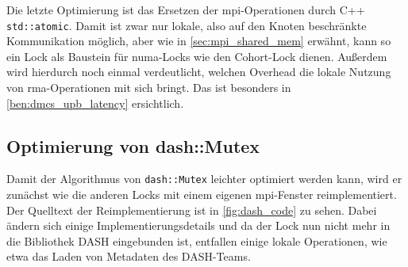 Die letzte Optimierung ist das Ersetzen der \gls{mpi}-Operationen durch C++ \texttt{std::atomic}.
Damit ist zwar nur lokale,
also auf den Knoten beschränkte Kommunikation möglich,
aber wie in \autoref{sec:mpi_shared_mem} erwähnt,
kann so ein Lock als Baustein für \gls{numa}-Locks wie den Cohort-Lock \cite{Cohort-Lock} dienen.
Außerdem wird hierdurch noch einmal verdeutlicht,
welchen Overhead die lokale Nutzung von \gls{rma}-Operationen mit sich bringt.
Das ist besonders in \autoref{ben:dmcs_upb_latency} ersichtlich.

\clearpage

\subsection{Optimierung von dash::Mutex}
\label{sec:optimierung_dash}

Damit der Algorithmus von \texttt{dash::Mutex} leichter optimiert werden kann,
wird er zunächst wie die anderen Locks mit einem eigenen \gls{mpi}-\gls{Fenster} reimplementiert.
Der Quelltext der Reimplementierung ist in \autoref{fig:dash_code} zu sehen.
Dabei ändern sich einige Implementierungsdetails
und da der Lock nun nicht mehr in die Bibliothek DASH eingebunden ist,
entfallen einige lokale Operationen,
wie etwa das Laden von Metadaten des DASH-Teams.

